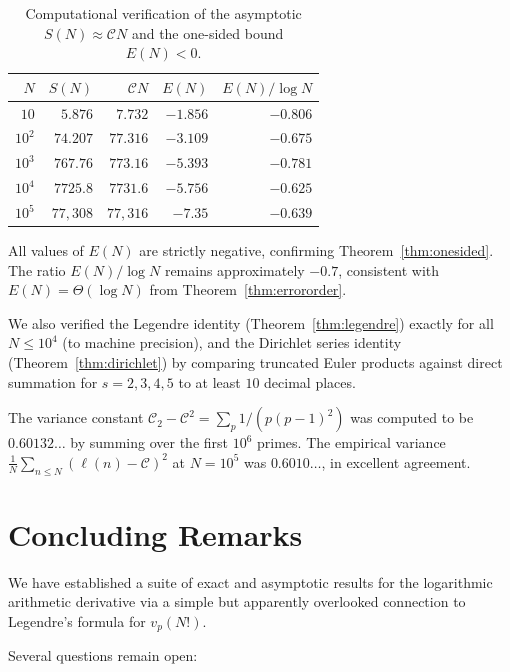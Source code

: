 \documentclass[11pt,a4paper]{amsart}
\theoremstyle{plain}
\theoremstyle{definition}
\begin{document}
\begin{table}[h]
\centering
\caption{Computational verification of the asymptotic $S(N) \approx \mathcal{C}N$ and 
the one-sided bound $E(N) < 0$.}\label{tab:verify}
\begin{tabular}{@{}rrrrr@{}}
\toprule
$N$ & $S(N)$ & $\mathcal{C}N$ & $E(N)$ & $E(N)/\!\log N$ \\
\midrule
$10$ & $5.876$ & $7.732$ & $-1.856$ & $-0.806$ \\
$10^2$ & $74.207$ & $77.316$ & $-3.109$ & $-0.675$ \\
$10^3$ & $767.76$ & $773.16$ & $-5.393$ & $-0.781$ \\
$10^4$ & $7725.8$ & $7731.6$ & $-5.756$ & $-0.625$ \\
$10^5$ & $77{,}308$ & $77{,}316$ & $-7.35$ & $-0.639$ \\
\bottomrule
\end{tabular}
\end{table}

All values of $E(N)$ are strictly negative, confirming Theorem~\ref{thm:onesided}.  
The ratio $E(N)/\log N$ remains approximately $-0.7$, consistent with $E(N) = \Theta(\log N)$ from 
Theorem~\ref{thm:errororder}.

We also verified the Legendre identity (Theorem~\ref{thm:legendre}) exactly 
for all $N \le 10^4$ (to machine precision), and the Dirichlet series identity (Theorem~\ref{thm:dirichlet}) 
by comparing truncated Euler products against direct summation for 
$s = 2, 3, 4, 5$ to at least $10$ decimal places.

The variance constant $\mathcal{C}_2 - \mathcal{C}^2 = \sum_p 1/(p(p-1)^2)$ was 
computed to be $0.60132\ldots$ by summing over the first $10^6$ primes.  
The empirical variance $\frac{1}{N}\sum_{n \le N}(\ell(n) - \mathcal{C})^2$ 
at $N = 10^5$ was $0.6010\ldots$, in excellent agreement.

\section{Concluding Remarks}

We have established a suite of exact and asymptotic results for the 
logarithmic arithmetic derivative via a simple but apparently overlooked 
connection to Legendre's formula for $v_p(N!)$.

Several questions remain open:
\end{document}

